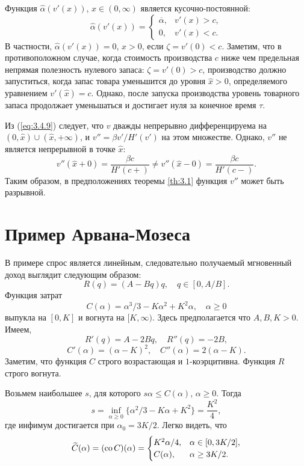Функция $\widehat \alpha(v'(x))$, $x\in (0,\infty)$ является кусочно-постоянной:
$$ \widehat\alpha(v'(x))=\begin{cases}
\overline\alpha,& v'(x)>c,\\
0,& v'(x)<c.
\end{cases}$$
В частности, $\widehat\alpha(v'(x))=0$, $x>0$, если $\zeta=v'(0)<c$. Заметим, что в противоположном случае, когда стоимость производства $c$ ниже чем предельная непрямая полезность нулевого запаса: $\zeta=v'(0)>c$, производство должно запуститься, когда запас товара уменьшится до уровня $\widehat x>0$, определяемого уравнением $v'(\widehat x)=c$. Однако, после запуска производства уровень товарного запаса продолжает уменьшаться и достигает нуля за конечное время $\tau$.

Из (\ref{eq:3.4.9}) следует, что $v$ дважды непрерывно дифференцируема на $(0,\widehat x)\cup(\widehat x,+\infty)$, и $v''=\beta v'/H'(v')$ на этом множестве. Однако, $v''$ не является непрерывной в точке $\widehat x$:
$$ v''(\widehat x+0)=\frac{\beta c}{H'(c+)}\neq v''(\widehat x-0)=\frac{\beta c}{H'(c-)}.
$$
Таким образом, в предположениях теоремы \ref{th:3.1} функция $v''$ может быть разрывной.

\section{Пример Арвана-Мозеса}\label{sec:3.6}
В примере \cite{ArvMos81} спрос является линейным, следовательно получаемый мгновенный доход выглядит следующим образом:
$$ R(q)=(A-Bq)q,\quad q\in [0,A/B].$$
Функция затрат
$$ C(\alpha)=\alpha^3/3-K\alpha^2+K^2\alpha,\quad \alpha\ge 0$$
выпукла на $[0,K]$ и вогнута на $[K,\infty)$. Здесь предполагается что $A, B, K>0$.
Имеем,
$$ R'(q)=A-2Bq,\quad R''(q)=-2B,$$
$$ C'(\alpha)=(\alpha-K)^2,\quad C''(\alpha)=2(\alpha-K).$$
Заметим, что функция $C$ строго возрастающая и $1$-коэрцитивна. Функция $R$ строго вогнута.

Возьмем наибольшее $s$, для которого $s\alpha\le C(\alpha)$, $\alpha\ge 0$. Тогда
$$ s=\inf_{\alpha\ge 0}\{\alpha^2/3-K\alpha+K^2\}=\frac{K^2}{4},$$
где инфимум достигается при $\alpha_0=3K/2$. Легко видеть, что
$$ \widetilde C(\alpha)=({\rm co\,} C)(\alpha)=\begin{cases}
K^2\alpha/4,&\alpha\in [0,3K/2],\\
C(\alpha),&\alpha\ge 3K/2.
\end{cases}$$

